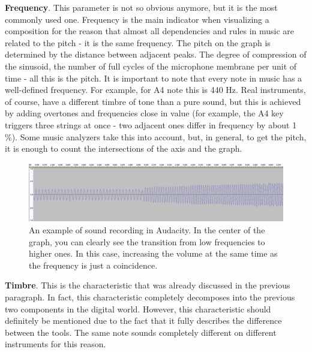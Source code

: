 \documentclass[thesis=B,english]{FITthesis}[2019/12/23]
\begin{document}
\textbf{Frequency}. This parameter is not so obvious anymore, but it is the most commonly used one. Frequency is the main indicator when visualizing a composition for the reason that almost all dependencies and rules in music are related to the pitch - it is the same frequency. The pitch on the graph is determined by the distance between adjacent peaks. The degree of compression of the sinusoid, the number of full cycles of the microphone membrane per unit of time - all this is the pitch. It is important to note that every note in music has a well-defined frequency. For example, for A4 note this is 440 Hz. Real instruments, of course, have a different timbre of tone than a pure sound, but this is achieved by adding overtones and frequencies close in value (for example, the A4 key triggers three strings at once - two adjacent ones differ in frequency by about 1 \%). Some music analyzers take this into account, but, in general, to get the pitch, it is enough to count the intersections of the axis and the graph.

\begin{figure}[ht]
            \includegraphics[width=\textwidth]{audacity_2.png}
            \caption[Audacity recording - frequency]{An example of sound recording in Audacity. In the center of the graph, you can clearly see the transition from low frequencies to higher ones. In this case, increasing the volume at the same time as the frequency is just a coincidence.}
            \label{fig:audacity_2}
\end{figure}

\textbf{Timbre}. This is the characteristic that was already discussed in the previous paragraph. In fact, this characteristic completely decomposes into the previous two components in the digital world. However, this characteristic should definitely be mentioned due to the fact that it fully describes the difference between the tools. The same note sounds completely different on different instruments for this reason.
\end{document}
